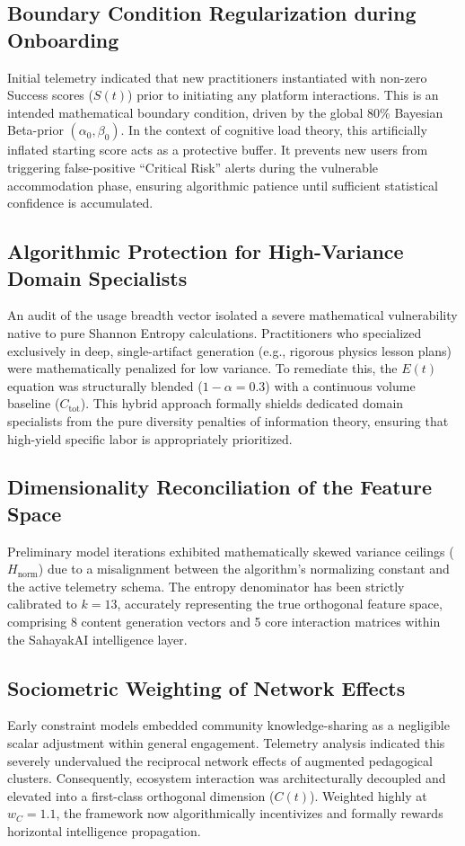 \documentclass[11pt,a4paper]{article}
\begin{document}
\subsection{Boundary Condition Regularization during Onboarding}
Initial telemetry indicated that new practitioners instantiated with non-zero Success scores ($S(t)$) prior to initiating any platform interactions. This is an intended mathematical boundary condition, driven by the global $80\%$ Bayesian Beta-prior $(\alpha_0, \beta_0)$. In the context of cognitive load theory, this artificially inflated starting score acts as a protective buffer. It prevents new users from triggering false-positive ``Critical Risk'' alerts during the vulnerable accommodation phase, ensuring algorithmic patience until sufficient statistical confidence is accumulated.

\subsection{Algorithmic Protection for High-Variance Domain Specialists}
An audit of the usage breadth vector isolated a severe mathematical vulnerability native to pure Shannon Entropy calculations. Practitioners who specialized exclusively in deep, single-artifact generation (e.g., rigorous physics lesson plans) were mathematically penalized for low variance. To remediate this, the $E(t)$ equation was structurally blended ($1-\alpha=0.3$) with a continuous volume baseline ($C_{\text{tot}}$). This hybrid approach formally shields dedicated domain specialists from the pure diversity penalties of information theory, ensuring that high-yield specific labor is appropriately prioritized.

\subsection{Dimensionality Reconciliation of the Feature Space}
Preliminary model iterations exhibited mathematically skewed variance ceilings ($H_{\text{norm}}$) due to a misalignment between the algorithm's normalizing constant and the active telemetry schema. The entropy denominator has been strictly calibrated to $k=13$, accurately representing the true orthogonal feature space, comprising 8 content generation vectors and 5 core interaction matrices within the SahayakAI intelligence layer.

\subsection{Sociometric Weighting of Network Effects}
Early constraint models embedded community knowledge-sharing as a negligible scalar adjustment within general engagement. Telemetry analysis indicated this severely undervalued the reciprocal network effects of augmented pedagogical clusters. Consequently, ecosystem interaction was architecturally decoupled and elevated into a first-class orthogonal dimension ($C(t)$). Weighted highly at $w_C=1.1$, the framework now algorithmically incentivizes and formally rewards horizontal intelligence propagation.
\end{document}
